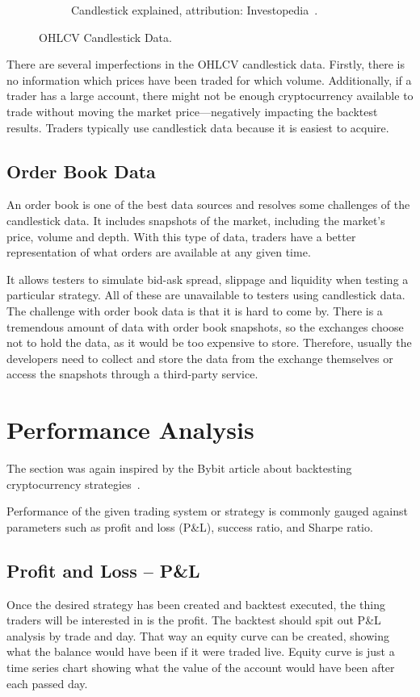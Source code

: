 \begin{figure}
\begin{subfigure}[t]{0.45\textwidth}
        \caption{Candlestick explained, attribution: Investopedia~\cite{investopedia:candlestick-charts}.}
        \label{candlestick-figure}
    \end{subfigure}
    \caption{OHLCV Candlestick Data.}
\end{figure}

There are several imperfections in the OHLCV candlestick data. Firstly, there is no information which prices have been traded for which volume. Additionally, if a trader has a large account, there might not be enough cryptocurrency available to trade without moving the market price---negatively impacting the backtest results. Traders typically use candlestick data because it is easiest to acquire.

\subsection*{Order Book Data}
An order book is one of the best data sources and resolves some challenges of the candlestick data. It includes snapshots of the market, including the market's price, volume and depth. With this type of data, traders have a better representation of what orders are available at any given time.

It allows testers to simulate bid-ask spread, slippage and liquidity when testing a particular strategy. All of these are unavailable to testers using candlestick data. The challenge with order book data is that it is hard to come by. There is a tremendous amount of data with order book snapshots, so the exchanges choose not to hold the data, as it would be too expensive to store. Therefore, usually the developers need to collect and store the data from the exchange themselves or access the snapshots through a third-party service.

\section{Performance Analysis}
\label{performance-analysis}
The section was again inspired by the Bybit article about backtesting cryptocurrency strategies~\cite{backtesting-crypto-trading-strategies}.

Performance of the given trading system or strategy is commonly gauged against parameters such as profit and loss (P\&L), success ratio, and Sharpe ratio.

\subsection*{Profit and Loss -- P\&L}
Once the desired strategy has been created and backtest executed, the thing traders will be interested in is the profit. The backtest should spit out P\&L analysis by trade and day. That way an equity curve can be created, showing what the balance would have been if it were traded live. Equity curve is just a time series chart showing what the value of the account would have been after each passed day.

